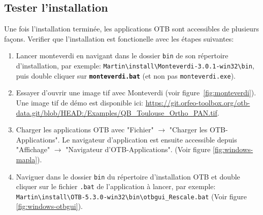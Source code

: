 \documentclass[10pt,a4paper]{article}
\begin{document}
\subsection{Tester l'installation}
Une fois l'installation terminée, les applications OTB sont accessibles de
plusieurs façons. Verifier que l'installation est fonctionelle avec les étapes
suivantes:
\begin{enumerate}

\item Lancer monteverdi en navigant dans le dossier \texttt{bin} de son répertoire
d'installation, par exemple:
\texttt{Martin{\textbackslash}install{\textbackslash}Monteverdi-3.0.1-win32{\textbackslash}bin},
puis double cliquer sur \textbf{\texttt{monteverdi.bat}} (et non pas
\texttt{monteverdi.exe}).

\item Essayer d'ouvrir une image tif avec Monteverdi (voir
  figure~\ref{fig:monteverdi}). Une image tif de démo est
disponible ici: \url{https://git.orfeo-toolbox.org/otb-data.git/blob/HEAD:/Examples/QB\_Toulouse\_Ortho\_PAN.tif}.

\item Charger les applications OTB avec "Fichier" $\rightarrow$ "Charger les
OTB-Applications".
Le navigateur d'application est ensuite accessible depuis "Affichage"
$\rightarrow$ "Navigateur d'OTB-Applications".
(Voir figure \ref{fig:windows-mapla}).

\item Naviguer dans le dossier \texttt{bin} du répertoire d'installation OTB et double cliquer sur le
fichier \texttt{.bat} de l'application à lancer, par exemple:\\
\texttt{Martin{\textbackslash}install{\textbackslash}OTB-5.3.0-win32{\textbackslash}bin{\textbackslash}otbgui\_Rescale.bat}
(Voir figure \ref{fig:windows-otbgui}).

\end{enumerate}
\end{document}

